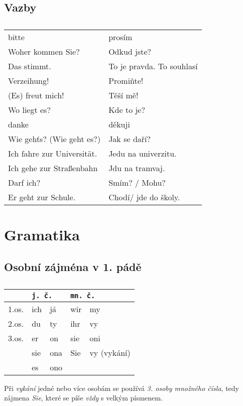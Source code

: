   \subsection*{Vazby}
    \begin{table}[ht!]   %
      \begin{tabular}{ll}
        bitte                      & prosím                     \\
        Woher kommen Sie?          & Odkud jste?                \\
        Das stimmt.                & To je pravda. To souhlasí  \\
        Verzeihung!                & Promiňte!                  \\
        (Es) freut mich!           & Těší mě!                   \\
        Wo liegt es?               & Kde to je?                 \\
        danke                      & děkuji                     \\
        Wie gehťs? (Wie geht es?)  & Jak se daří?               \\
        Ich fahre zur Universität. & Jedu na univerzitu.        \\
        Ich gehe zur Straßenbahn   & Jdu na tramvaj.            \\
        Darf ich?                  & Smím? / Mohu?              \\
        Er geht zur Schule.        & Chodí/ jde do školy. 
      \end{tabular}
      \caption*{ }
    \end{table}


\section*{Gramatika}
  \subsection*{Osobní zájména v 1. pádě}
    \begin{table}[ht!]   %
      \begin{tabular}{lllll}
        \hline
              & \multicolumn{2}{l}{\texttt{j. č.}}
              & \multicolumn{2}{l}{\texttt{mn. č.}}     \\  
        \hline
        1.os. & ich & já  & wir & my          \\
        2.os. & du  & ty  & ihr & vy          \\
        3.os. & er  & on  & sie & oni         \\
              & sie & ona & Sie & vy (vykání) \\
              & es  & ono &     &             \\
        \hline
      \end{tabular}
      \caption*{ }
    \end{table}
    Při \emph{vykání} jedné nebo více osobám se používá \emph{3. osoby množného čísla}, tedy 
    zájmena \emph{Sie}, které se píše \emph{vždy} s velkým písmenem.
          
